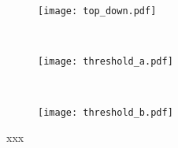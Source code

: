   \begin{figure}[!ht]
    \centering
    \begin{subfigure}[b]{0.33\linewidth}
      \centering
      \texttt{[image: top\_down.pdf]}
      \caption{}\label{fig:top_down}
    \end{subfigure}~
  \begin{subfigure}[b]{0.33\linewidth}
    \centering
    \texttt{[image: threshold\_a.pdf]}
    \caption{}\label{fig:threshold_a}
  \end{subfigure}~
  \begin{subfigure}[b]{0.33\linewidth}
    \centering
    \texttt{[image: threshold\_b.pdf]}
    \caption{}\label{fig:threshold_b}
  \end{subfigure}
    \caption{xxx}\label{fig:mmi_example}
  \end{figure}
